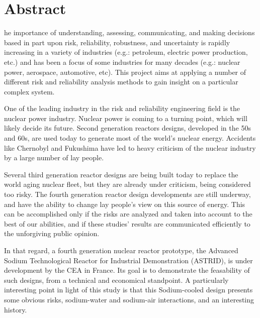 \chapter*{Abstract}
\begin{SingleSpace}
he importance of understanding, assessing, communicating, and making decisions based in part upon risk, reliability, robustness, and uncertainty is rapidly increasing in a variety of industries (e.g.: petroleum, electric power production, etc.) and has been a focus of some industries for many decades (e.g.: nuclear power, aerospace, automotive, etc). This project aims at applying a number of different risk and reliability analysis methods to gain insight on a particular complex system.

One of the leading industry in the risk and reliability engineering field is the nuclear power industry. Nuclear power is coming to a turning point, which will likely decide its future. Second generation reactors designs, developed in the 50s and 60s, are used today to generate most of the world's nuclear energy. Accidents like Chernobyl and Fukushima have led to heavy criticism of the nuclear industry by a large number of lay people.

Several third generation reactor designs are being built today to replace the world aging nuclear fleet, but they are already under criticism, being considered too risky. The fourth generation reactor design developments are still underway, and have the ability to change lay people's view on this source of energy. This can be accomplished only if the risks are analyzed and taken into account to the best of our abilities, and if these studies' results are communicated efficiently to the unforgiving public opinion.

In that regard, a fourth generation nuclear reactor prototype, the Advanced Sodium Technological Reactor for Industrial Demonstration (ASTRID), is under development by the CEA in France. Its goal is to demonstrate the feasability of such designs, from a technical and economical standpoint. A particularly interesting point in light of this study is that this Sodium-cooled design presents some obvious risks, sodium-water and sodium-air interactions, and an interesting history.
\end{SingleSpace}
\clearpage
